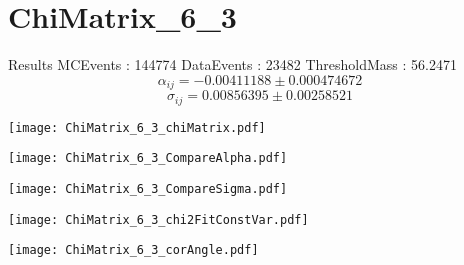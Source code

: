 \documentclass[a4paper,12pt]{article}
\begin{document}
\section{ChiMatrix\_6\_3}
\begin{minipage}{0.49\linewidth} Results \newline
MCEvents : 144774\newline
DataEvents : 23482 \newline
ThresholdMass : 56.2471\\
$$\alpha_{ij} = -0.00411188\pm 0.000474672$$
$$\sigma_{ij} = 0.00856395\pm 0.00258521$$
\end{minipage}\hfill
\begin{minipage}{0.49\linewidth} 
\texttt{[image: ChiMatrix\_6\_3\_chiMatrix.pdf]}\\
\end{minipage}
\hfill
\begin{minipage}{0.49\linewidth} 
\texttt{[image: ChiMatrix\_6\_3\_CompareAlpha.pdf]}\\
\end{minipage}
\hfill
\begin{minipage}{0.49\linewidth} 
\texttt{[image: ChiMatrix\_6\_3\_CompareSigma.pdf]}\\
\end{minipage}
\begin{minipage}{0.49\linewidth} 
\texttt{[image: ChiMatrix\_6\_3\_chi2FitConstVar.pdf]}\\
\end{minipage}
\hfill
\begin{minipage}{0.49\linewidth} 
\texttt{[image: ChiMatrix\_6\_3\_corAngle.pdf]}\\
\end{minipage}
\end{document}

